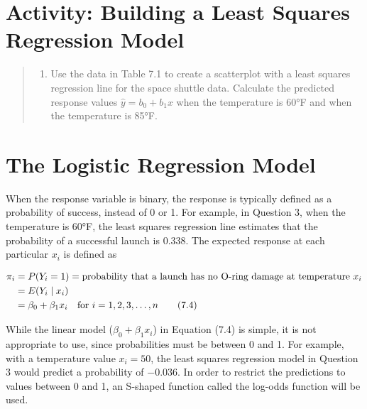 \documentclass[
]{report}
\providecommand{\tightlist}{%
  \setlength{\itemsep}{0pt}\setlength{\parskip}{0pt}}
\begin{document}
\hypertarget{activity-building-a-least-squares-regression-model-1}{%
\section*{Activity: Building a Least Squares Regression Model}\label{activity-building-a-least-squares-regression-model-1}}

\begin{quote}
\begin{enumerate}
\def\labelenumi{\arabic{enumi}.}
\setcounter{enumi}{2}
\tightlist
\item
  Use the data in Table 7.1 to create a scatterplot with a least squares regression line for the space shuttle data. Calculate the predicted response values \(\hat y = b_0 + b_1 x\) when the temperature is 60°F and when the temperature is 85°F.
\end{enumerate}
\end{quote}

\hypertarget{the-logistic-regression-model-1}{%
\section{\texorpdfstring{\textbf{The Logistic Regression Model}}{The Logistic Regression Model}}\label{the-logistic-regression-model-1}}

When the response variable is binary, the response is typically defined as a probability of success, instead of 0 or 1. For example, in Question 3, when the temperature is 60°F, the least squares regression line estimates that the probability of a successful launch is 0.338. The expected response at each particular \(x_i\) is defined as

\begin{align}
\pi_i &= P(Y_i = 1) = \text{probability that a launch has no O-ring damage at temperature } x_i \notag \\
      &= E(Y_i \mid x_i) \notag \\
      &= \beta_0 + \beta_1 x_i \quad \text{for } i = 1,2,3,\dots,n \tag{7.4}
\end{align}

While the linear model (\(\beta_0 + \beta_1 x_i\)) in Equation (7.4) is simple, it is not appropriate to use, since probabilities must be between 0 and 1. For example, with a temperature value \(x_i = 50\), the least squares regression model in Question 3 would predict a probability of \(-0.036\). In order to restrict the predictions to values between 0 and 1, an S-shaped function called the log-odds function will be used.
\end{document}
